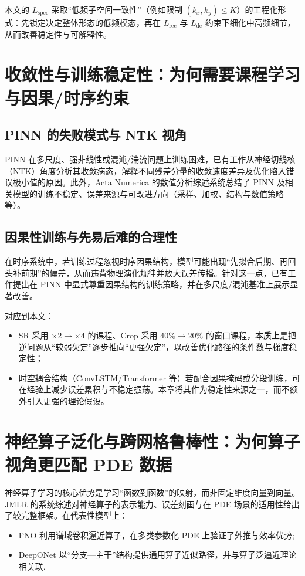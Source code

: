 本文的 $L_{\text{spec}}$ 采取“低频子空间一致性”（例如限制 $(k_x,k_y)\le K$）的工程化形式：先锁定决定整体形态的低频模态，再在 $L_{\text{rec}}$ 与 $L_{\text{dc}}$ 约束下细化中高频细节，从而改善稳定性与可解释性。

\section{收敛性与训练稳定性：为何需要课程学习与因果/时序约束}\label{sec:stability}

\subsection{PINN 的失败模式与 NTK 视角}\label{sec:ntk}
PINN 在多尺度、强非线性或混沌/湍流问题上训练困难，已有工作从神经切线核（NTK）角度分析其收敛病态，解释不同残差分量的收敛速度差异及优化陷入错误极小值的原因\cite{wang2022pinn_ntk}。此外，Acta Numerica 的数值分析综述系统总结了 PINN 及相关模型的训练不稳定、误差来源与可改进方向（采样、加权、结构与数值策略等）\cite{deryck2024acta_numerica}。

\subsection{因果性训练与先易后难的合理性}\label{sec:causal}
在时序系统中，若训练过程忽视时序因果结构，模型可能出现“先拟合后期、再回头补前期”的偏差，从而违背物理演化规律并放大误差传播。针对这一点，已有工作提出在 PINN 中显式尊重因果结构的训练策略，并在多尺度/混沌基准上展示显著改善\cite{wang2022causality_pinn}。

对应到本文：
\begin{itemize}
  \item SR 采用 $\times 2\rightarrow \times 4$ 的课程、Crop 采用 $40\%\rightarrow 20\%$ 的窗口课程，本质上是把逆问题从“较弱欠定”逐步推向“更强欠定”，以改善优化路径的条件数与梯度稳定性；
  \item 时空耦合结构（ConvLSTM/Transformer 等）若配合因果掩码或分段训练，可在经验上减少误差累积与不稳定振荡。本章将其作为稳定性来源之一，而不额外引入更强的理论假设。
\end{itemize}

\section{神经算子泛化与跨网格鲁棒性：为何算子视角更匹配 PDE 数据}\label{sec:neural_operator}

神经算子学习的核心优势是学习“函数到函数”的映射，而非固定维度向量到向量。JMLR 的系统综述对神经算子的表示能力、误差刻画与在 PDE 场景的适用性给出了较完整框架\cite{kovachki2023neural_operator}。在代表性模型上：
\begin{itemize}
  \item FNO 利用谱域卷积逼近算子，在多类参数化 PDE 上验证了外推与效率优势\cite{li2021fno};
  \item DeepONet 以“分支—主干”结构提供通用算子近似路径，并与算子泛逼近理论相关联\cite{lu2021deeponet}.
\end{itemize}

